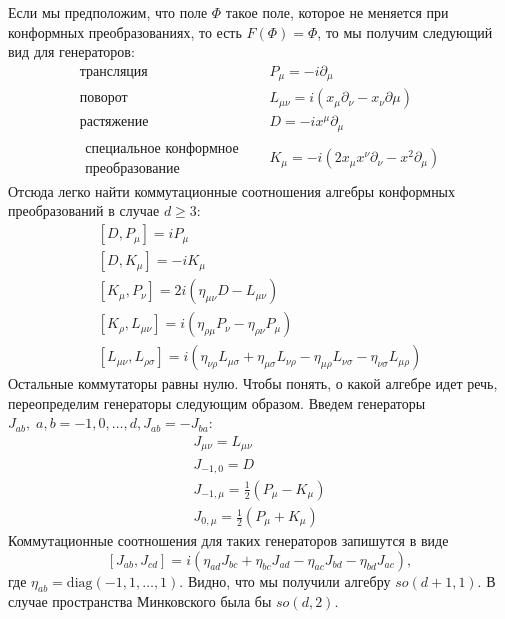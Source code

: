\documentclass[a4paper,12pt]{article}
\theoremstyle{definition}
\theoremstyle{definition}
\theoremstyle{definition}
\begin{document}
Если мы предположим, что поле $\Phi$ такое поле, которое не меняется при конформных преобразованиях, то есть $F(\Phi)=\Phi$, то мы получим следующий вид для генераторов:
\begin{eqnarray}
  \label{eq:169}
  \mbox{трансляция} & \quad P_{\mu}=-i\partial_{\mu}\\
  \mbox{поворот} & \quad L_{\mu\nu}=i(x_{\mu}\partial_{\nu}-x_{\nu}\partial{\mu})\\
  \mbox{растяжение}& \quad D=-ix^{\mu}\partial_{\mu}\\
  \begin{array}{r}
  \mbox{специальное конформное}    \\
  \mbox{преобразование}
  \end{array}
  & \quad K_{\mu}=-i(2x_{\mu}x^{\nu}\partial_{\nu}-x^2\partial_{\mu})
\end{eqnarray}
Отсюда легко найти коммутационные соотношения алгебры конформных преобразований в случае $d\geq 3$:
\begin{eqnarray}
  \label{eq:170}
  \left[D,P_{\mu}\right]=i P_{\mu}\\
  \left[D,K_{\mu}\right]=-i K_{\mu}\\
  \left[K_{\mu},P_{\nu}\right]=2i (\eta_{\mu\nu}D - L_{\mu\nu})\\
  \left[K_{\rho},L_{\mu\nu}\right]=i(\eta_{\rho\mu}P_{\nu}-\eta_{\rho\nu}P_{\mu})\\
 \left[L_{\mu\nu},L_{\rho\sigma}\right]=i(\eta_{\nu\rho}L_{\mu\sigma}+\eta_{\mu\sigma}L_{\nu\rho}-\eta_{\mu\rho}L_{\nu\sigma}-\eta_{\nu\sigma}L_{\mu\rho})
\end{eqnarray}
Остальные коммутаторы равны нулю.
Чтобы понять, о какой алгебре идет речь, переопределим генераторы следующим образом. Введем генераторы $J_{ab}, \; a,b=-1,0,\dots,d, J_{ab}=-J_{ba}$:
\begin{eqnarray}
  \label{eq:171}
  J_{\mu\nu}=L_{\mu\nu}\\
  J_{-1,0}=D\\
  J_{-1,\mu}=\frac{1}{2}(P_{\mu}-K_{\mu})\\
  J_{0,\mu}=\frac{1}{2}(P_{\mu}+K_{\mu})
\end{eqnarray}
Коммутационные соотношения для таких генераторов запишутся в виде
\begin{equation}
  \label{eq:172}
  \left[J_{ab},J_{cd}\right]=i(\eta_{ad}J_{bc}+\eta_{bc}J_{ad}-\eta_{ac}J_{bd}-\eta_{bd}J_{ac}),
\end{equation}
где $\eta_{ab}=\mathrm{diag}(-1,1,\dots,1)$. Видно, что мы получили алгебру $so(d+1,1)$. В случае пространства Минковского была бы $so(d,2)$.
\end{document}

